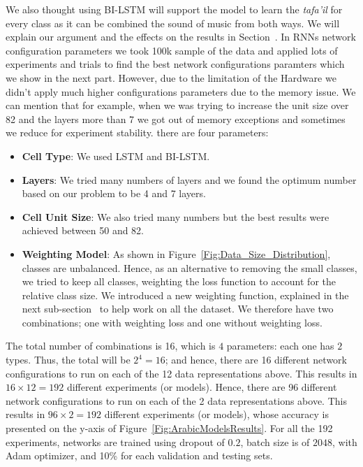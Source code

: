 We also thought using BI-LSTM will support the model to learn the \textit{tafa'il} for every class as it can be combined the sound of music from both ways. We will explain our argument and the effects on the results in Section~.
In RNNs network configuration parameters {\color{red} we took 100k sample of the data and applied lots of experiments and trials to find the best network configurations paramters which we show in the next part. However, due to the limitation of the Hardware we didn't apply much higher configurations parameters due to the memory issue. We can mention that for example, when we was trying to increase the unit size over 82 and the layers more than 7 we got out of memory exceptions and sometimes we reduce for experiment stability}.  there are four parameters:
\begin{itemize}
\item \textbf{Cell Type}: We used LSTM and BI-LSTM.
\item \textbf{Layers}: We tried many numbers of layers and we found the optimum number based on our problem to be 4 and 7 layers.
\item \textbf{Cell Unit Size}: We also tried many numbers but the best results were achieved between 50 and 82.
\item \textbf{Weighting Model}: As shown in Figure~\ref{Fig:Data_Size_Distribution}, classes are unbalanced. Hence, as an alternative to removing the small classes, we tried to keep all classes, weighting the loss function to account for the relative class size. We introduced a new weighting function, explained in the next sub-section~ to help work on all the dataset. We therefore have two combinations; one with weighting loss and one without weighting loss.
 
 \end{itemize}

The total number of combinations is 16, which is $4$ parameters: each one has $2$ types. Thus, the total will be $2^4=16$; and hence, there are 16 different network configurations to run on each of the 12 data representations above. This results in $16 \times 12 = 192$ different experiments (or models). Hence, there are 96 different network configurations to run on each of the 2 data representations above. This results in $96 \times 2 = 192$ different experiments (or models), whose accuracy is presented on the y-axis of Figure~\ref{Fig:ArabicModelsResults}. For all the 192 experiments, networks are trained using dropout of $0.2$, batch size is of $2048$, with Adam optimizer, and 10\% for each validation and testing sets.

